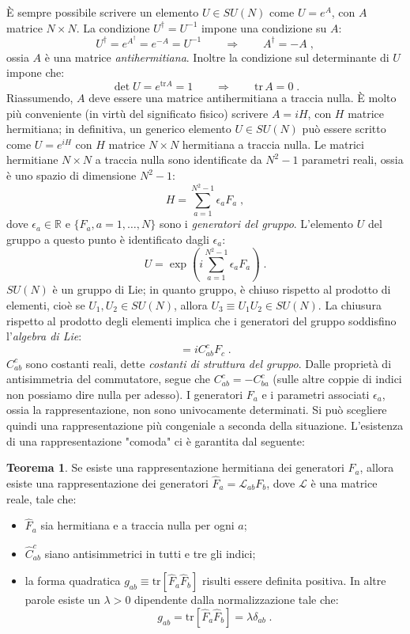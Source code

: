 \documentclass[12pt,a4paper]{article}
\theoremstyle{definition}
\newtheorem{thm}{Teorema}
\newcommand{\lag}{\mathcal{L}}
\newcommand{\adj}[1]{#1^{\dagger}}
\newcommand{\tr}{\mathrm{tr}}
\numberwithin{equation}{section}
\begin{document}
È sempre possibile scrivere un elemento $U\in SU(N)$ come $U=e^A$, con $A$ matrice $N\times N$. La condizione $\adj{U}=U^{-1}$ impone una condizione su $A$:
$$
\adj{U}=e^{\adj{A}}=e^{-A}=U^{-1}\qquad \Longrightarrow \qquad \adj{A}=-A\;,
$$
ossia $A$ è una matrice \emph{antihermitiana}. Inoltre la condizione sul determinante di $U$ impone che:
$$
\det U=e^{\tr A}=1\qquad \Longrightarrow\qquad \tr\, A=0\;.
$$
Riassumendo, $A$ deve essere una matrice antihermitiana a traccia nulla. È molto più conveniente (in virtù del significato fisico) scrivere $A=iH$, con $H$ matrice hermitiana; in definitiva, un generico elemento $U\in SU(N)$ può essere scritto come $U=e^{iH}$ con $H$ matrice $N\times N$ hermitiana a traccia nulla. Le matrici hermitiane $N\times N$ a traccia nulla sono identificate da $N^2-1$ parametri reali, ossia è uno spazio di dimensione $N^2-1$:
\begin{equation}
H=\sum_{a=1}^{N^2-1}\epsilon_a F_a\;,
\end{equation}
dove $\epsilon_a\in\mathbb{R}$ e $\{F_a, a=1,\ldots,N\}$ sono i \emph{generatori del gruppo}. L'elemento $U$ del gruppo a questo punto è identificato dagli $\epsilon_a$:
\begin{equation}
U=\exp\left(i\sum_{a=1}^{N^2-1}\epsilon_aF_a\right)\;.
\end{equation}
$SU(N)$ è un gruppo di Lie; in quanto gruppo, è chiuso rispetto al prodotto di elementi, cioè se $U_1,U_2\in SU(N)$, allora $U_3\equiv U_1U_2\in SU(N)$. La chiusura rispetto al prodotto degli elementi implica che i generatori del gruppo soddisfino l'\emph{algebra di Lie}:
\begin{equation}
[F_a,F_b]=iC^c_{ab}F_c\;.
\end{equation}
$C_{ab}^c$ sono costanti reali, dette \emph{costanti di struttura del gruppo}. Dalle proprietà di antisimmetria del commutatore, segue che $C_{ab}^c=-C^c_{ba}$ (sulle altre coppie di indici non possiamo dire nulla per adesso). I generatori $F_a$ e i parametri associati $\epsilon_a$, ossia la rappresentazione, non sono univocamente determinati. Si può scegliere quindi una rappresentazione più congeniale a seconda della situazione. L'esistenza di una rappresentazione "comoda" ci è garantita dal seguente:
\begin{thm} Se esiste una rappresentazione hermitiana dei generatori $F_a$, allora esiste una rappresentazione dei generatori $\hat{F}_a=\lag_{ab}F_b$, dove $\lag$ è una matrice reale, tale che:
\begin{itemize}
\item $\hat{F}_a$ sia hermitiana e a traccia nulla per ogni $a$;
\item $\hat{C}^c_{ab}$ siano antisimmetrici in tutti e tre gli indici;
\item la forma quadratica $g_{ab}\equiv\tr[\hat{F}_a\hat{F}_b]$ risulti essere definita positiva. In altre parole esiste un $\lambda>0$ dipendente dalla normalizzazione tale che:
\begin{equation}
g_{ab}=\tr[\hat{F}_a\hat{F}_b]=\lambda\delta_{ab}\;.
\end{equation}
\end{itemize}
\end{thm}
\end{document}
